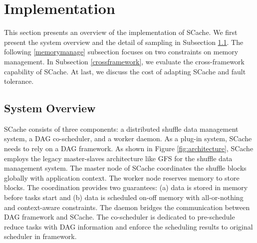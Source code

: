 \section{Implementation}\label{impl}
This section presents an overview of the implementation of SCache. 
{\color{blue}
We first present the system overview and the detail of sampling in Subsection \ref{arch}. 
The following \ref{memorymanage} subsection focuses on two constraints on memory management.
In Subsection \ref{crossframework}, we evaluate the cross-framework capability of SCache. 
At last, we discuss the cost of adapting SCache and fault tolerance. 
}


\subsection{System Overview}\label{arch}
SCache consists of three components: a distributed shuffle data management system, a DAG co-scheduler, and a %
{\color{blue} worker daemon. As a plug-in system, SCache needs to rely on a DAG framework.} As shown in Figure \ref{fig:architecture}, SCache employs the legacy master-slaves architecture like GFS \cite{gfs} for the shuffle data management system. 
The master node of SCache coordinates the shuffle blocks globally with application context. The worker node reserves memory to store blocks.
The coordination provides two guarantees: (a) data is stored in memory before tasks start and (b) data is scheduled on-off memory with all-or-nothing and context-aware constraints. 
The daemon bridges the communication between %
{\color{blue} DAG framework} and SCache. The co-scheduler is dedicated to pre-schedule reduce tasks with DAG information and enforce the scheduling results to %
 {\color{blue} original scheduler in framework}.



